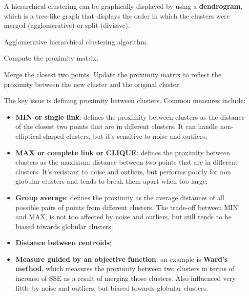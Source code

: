 A hierarchical clustering can be graphically displayed by using a \textbf{dendrogram}, which is a tree-like graph that displays the order in which the clusters were merged (agglomerative) or split (divisive).

\begin{algorithm}
\caption{Agglomerative hierarchical clustering algorithm.}
\begin{algorithmic}[1]
    \State Compute the proximity matrix.

    \Repeat
        \State Merge the closest two points.
        \State Update the proximity matrix to reflect the proximity between the new cluster and the original cluster.
\end{algorithmic}
\end{algorithm}

The key issue is defining proximity between clusters. Common measures include:

\begin{itemize}
    \item \textbf{MIN or single link}: defines the proximity between clusters as the distance of the closest two points that are in different clusters. It can handle non-elliptical shaped clusters, but it's sensitive to noise and outliers;

    \item \textbf{MAX or complete link or CLIQUE}: defines the proximity between clusters as the maximum distance between two points that are in different clusters. It's resistant to noise and outliers, but performs poorly for non globular clusters and tends to break them apart when too large;

    \item \textbf{Group average}: defines the proximity as the average distances of all possible pairs of points from different clusters. The trade-off between MIN and MAX, is not too affected by noise and outliers, but still tends to be biased towards globular clusters;

    \item \textbf{Distance between centroids};

    \item \textbf{Measure guided by an objective function}: an example is \textbf{Ward's method}, which measures the proximity between two clusters in terms of increase of SSE as a result of merging those clusters. Also influenced very little by noise and outliers, but biased towards globular clusters.
\end{itemize}

